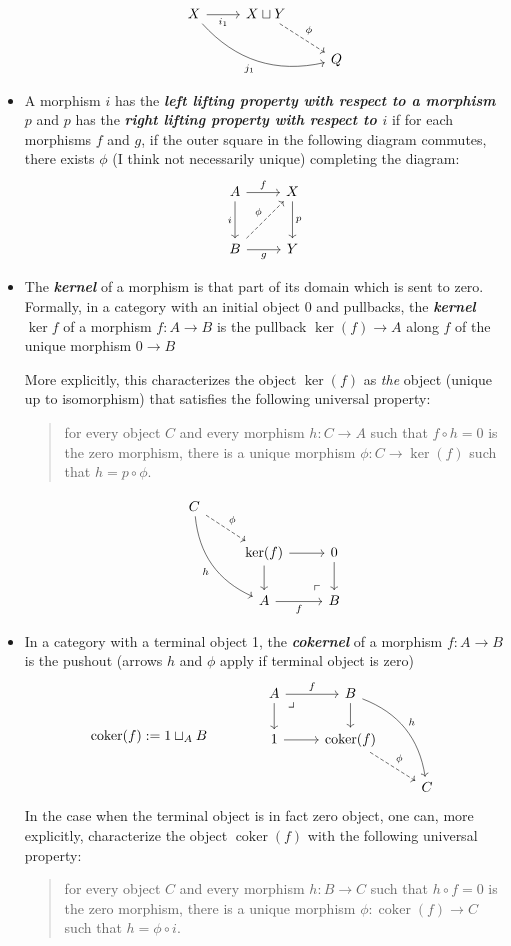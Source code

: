 \documentclass{article}
\DeclareMathOperator{\coker}{coker}
\begin{document}
\begin{defn}
\begin{itemize}
\[\begin{tikzcd}
			X\arrow[r,"i_1",swap]\arrow[drr,bend right,swap,"j_1"]&X\sqcup Y\arrow[dr,dashed,"\phi"]\\
			&&Q
		\end{tikzcd}\]
		\item A morphism $i$ has the \textbf{\textit{left lifting property with respect to a morphism $p$}} and $p$ has the \textbf{\textit{right lifting property with respect to $i$}} if for each morphisms $f$ and $g$, if the outer square in the following diagram commutes, there exists $\phi$ (I think not necessarily unique) completing the diagram:
		\[\begin{tikzcd}[row sep=large]
			A\arrow[r,"f"]\arrow[d,"i",swap]&X\arrow[d,"p"]\\
			B\arrow[r,"g",swap]\arrow[ur,dashed,"\phi"]&Y
		\end{tikzcd}\]
		\item The \textbf{\textit{kernel}} of a morphism is that part of its domain which is sent to zero. Formally, in a category with an initial object 0 and pullbacks, the \textbf{\textit{kernel $\ker f$}} of a morphism $f:A\to B$ is the pullback $\ker(f)\to A$ along $f$ of the unique morphism $0\to B$
		
		More explicitly, this characterizes the object $\ker(f)$ as \textit{the} object (unique up to isomorphism) that satisfies the following universal property:
		\begin{quote}
			for every object $C$ and every morphism $h:C\to A$ such that $f\circ h=0$ is the zero morphism, there is a unique morphism $\phi:C\to\ker(f)$ such that $h=p\circ\phi$.
		\end{quote}
		\[\begin{tikzcd}
			C\arrow[dr,dashed,"\phi"]\arrow[ddr,bend right,swap,"h"]\\
			&\ker(f)\arrow[d]\arrow[r]&0\arrow[d]\\
			&A\arrow[r,"f",swap]&B\arrow[ul, phantom, "\ulcorner", very near start]
		\end{tikzcd}\]
		\item In a category with a terminal object 1, the \textbf{\textit{cokernel}} of a morphism $f:A\to B$ is the pushout (arrows $h$ and $\phi$ apply if terminal object is zero)
		\[\coker(f):=1\sqcup_AB\qquad\qquad\begin{tikzcd}
			A\arrow[r,"f"]\arrow[d]\arrow[dr, phantom, "\lrcorner", very near start]&B\arrow[d]\arrow[rdd,bend left,"h"]\\
			1\arrow[r]&\coker(f)\arrow[dr,dashed,"\phi"]\\
			&&C
		\end{tikzcd}\]
		In the case when the terminal object is in fact zero object, one can, more explicitly, characterize the object $\coker(f)$ with the following universal property:
		\begin{quote}
			for every object $C$ and every morphism $h:B\to C$ such that $h\circ f=0$ is the zero morphism, there is a unique morphism $\phi:\coker(f)\to C$ such that $h=\phi\circ i$.
		\end{quote}
		

\end{itemize}
\end{defn}
\end{document}

